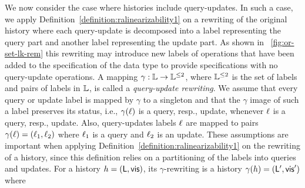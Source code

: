 
We now consider the case where histories include query-updates.
In such a case, we apply
Definition~\ref{definition:ralinearizability1} on a rewriting of the 
original history where each query-update is decomposed into a label
representing the query part and another label representing the update
part.
%
As shown in \figureautorefname~\ref{fig:or-set-lk-rem} this rewriting
may introduce new labels of operations that have been added to the
specification of the data type to provide specifications with no
query-update operations.
A mapping $\gamma:\mathbb{L}\rightarrow \mathbb{L}^{\leq 2}$, where $\mathbb{L}^{\leq 2}$ is the set of labels and pairs of labels in $\mathbb{L}$, is called a \emph{query-update rewriting}.
We assume that every query or update label is mapped by $\gamma$ to a
singleton and that the $\gamma$ image of such a label preserves its
status, i.e., $\gamma(\ell)$ is a query, resp., update, whenever
$\ell$ is a query, resp., update. Also, query-updates labels
$\ell$ are mapped to pairs $\gamma(\ell)=(\ell_1,\ell_2)$
where $\ell_1$ is a query and $\ell_2$ is an update. These
assumptions are important when applying Definition~\ref{definition:ralinearizability1} on the rewriting of a history, since this definition relies on a partitioning of the labels into queries and updates.
For a history $h=(\mathsf{L},\mathsf{vis})$, its $\gamma$-rewriting is a
history $\gamma(h)=(\mathsf{L}',\mathsf{vis}')$ where
